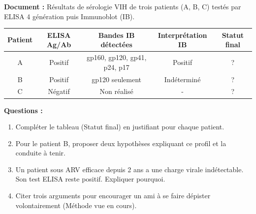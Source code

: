 \documentclass[11pt]{article}
\begin{document}
\begin{exercice}
\textbf{Document :} Résultats de sérologie VIH de trois patients (A, B, C) testés par ELISA 4 génération puis Immunoblot (IB).
\begin{center}
\begin{tabular}{|c|c|c|c|c|}\hline
\textbf{Patient} & \textbf{ELISA Ag/Ab} & \textbf{Bandes IB détectées} & \textbf{Interprétation IB} & \textbf{Statut final} \\ \hline
A & Positif & gp160, gp120, gp41, p24, p17 & Positif & ? \\ \hline
B & Positif & gp120 seulement & Indéterminé & ? \\ \hline
C & Négatif & Non réalisé & - & ? \\ \hline
\end{tabular}
\end{center}
\textbf{Questions :}
\begin{enumerate}
    \item Compléter le tableau (Statut final) en justifiant pour chaque patient.
    \item Pour le patient B, proposer deux hypothèses expliquant ce profil et la conduite à tenir.
    \item Un patient sous ARV efficace depuis 2 ans a une charge virale indétectable. Son test ELISA reste positif. Expliquer pourquoi.
    \item Citer trois arguments pour encourager un ami à se faire dépister volontairement (Méthode vue en cours).
\end{enumerate}
\end{exercice}
\end{document}
